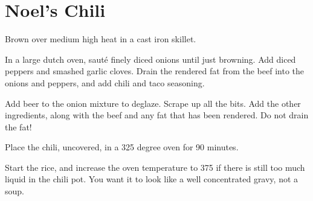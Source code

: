 \section{Noel's Chili}
\begin{recipe}



Brown over medium high heat in a cast iron skillet.


In a large dutch oven, sauté finely diced onions until just browning. Add diced peppers and smashed garlic cloves. Drain the rendered fat from the beef into the onions and peppers, and add chili and taco seasoning.



Add beer to the onion mixture to deglaze. Scrape up all the bits. Add the other ingredients, along with the beef and any fat that has been rendered. Do not drain the fat!

Place the chili, uncovered, in a 325 degree oven for 90 minutes.


Start the rice, and increase the oven temperature to 375 if there is still too much liquid in the chili pot. You want it to look like a well concentrated gravy, not a soup.



\end{recipe}
